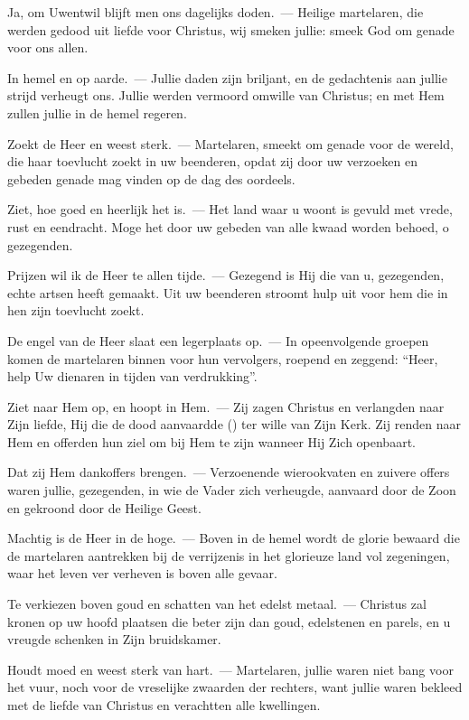 \documentclass[12pt,twoside,a5paper]{article}
\begin{document}
\begin{halfparskip}

  Ja, om Uwentwil blijft men ons dagelijks doden.~--- Heilige martelaren, die werden gedood uit liefde voor Christus, wij smeken jullie: smeek God om genade voor ons allen.

  In hemel en op aarde.~--- Jullie daden zijn briljant, en de gedachtenis aan jullie strijd verheugt ons. Jullie werden vermoord omwille van Christus; en met Hem zullen jullie in de hemel regeren.

  Zoekt de Heer en weest sterk.~--- Martelaren, smeekt om genade voor de wereld, die haar toevlucht zoekt in uw beenderen, opdat zij door uw verzoeken en gebeden genade mag vinden op de dag des oordeels.

  Ziet, hoe goed en heerlijk het is.~--- Het land waar u woont is gevuld met vrede, rust en eendracht. Moge het door uw gebeden van alle kwaad worden behoed, o gezegenden.

  Prijzen wil ik de Heer te allen tijde.~--- Gezegend is Hij die van u, gezegenden, echte artsen heeft gemaakt. Uit uw beenderen stroomt hulp uit voor hem die in hen zijn toevlucht zoekt.

  De engel van de Heer slaat een legerplaats op.~--- In opeenvolgende groepen komen de martelaren binnen voor hun vervolgers, roepend en zeggend: ``Heer, help Uw dienaren in tijden van verdrukking''.

  Ziet naar Hem op, en hoopt in Hem.~--- Zij zagen Christus en verlangden naar Zijn liefde, Hij die de dood aanvaardde () ter wille van Zijn Kerk. Zij renden naar Hem en offerden hun ziel om bij Hem te zijn wanneer Hij Zich openbaart.

  Dat zij Hem dankoffers brengen.~--- Verzoenende wierookvaten en zuivere offers waren jullie, gezegenden, in wie de Vader zich verheugde, aanvaard door de Zoon en gekroond door de Heilige Geest.

  Machtig is de Heer in de hoge.~--- Boven in de hemel wordt de glorie bewaard die de martelaren aantrekken bij de verrijzenis in het glorieuze land vol zegeningen, waar het leven ver verheven is boven alle gevaar.

  Te verkiezen boven goud en schatten van het edelst metaal.~--- Christus zal kronen op uw hoofd plaatsen die beter zijn dan goud, edelstenen en parels, en u vreugde schenken in Zijn bruidskamer.

  Houdt moed en weest sterk van hart.~--- Martelaren, jullie waren niet bang voor het vuur, noch voor de vreselijke zwaarden der rechters, want jullie waren bekleed met de liefde van Christus en verachtten alle kwellingen.


\end{halfparskip}
\end{document}
